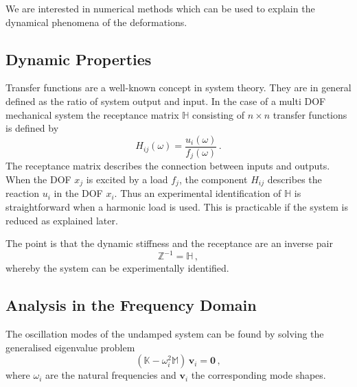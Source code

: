 \documentclass[conference]{journal}
\newcommand{\bb}[1]{\mathbb{#1}}
\newcommand{\B}[1]{\mathbf{#1}}
\newcommand{\M}{\bb{M}}
\newcommand{\K}{\bb{K}}
\begin{document}


	We are interested in numerical methods which can be used to explain the dynamical phenomena of the deformations. 

	\subsection{Dynamic Properties}
	Transfer functions are a well-known concept in system theory. They are in general defined as the ratio of system output and input. In the case of a multi DOF mechanical system the receptance matrix $\bb{H}$ consisting of $n \times n$ transfer functions is defined by
	\begin{equation}
	H_{ij}(\omega) = \frac{u_i(\omega)}{f_j(\omega)}\,.
	\end{equation}
	The receptance matrix describes the connection between inputs and outputs. When the DOF $x_j$ is excited by a load $f_j$, the component $H_{ij}$ describes the reaction $ u_i $ in the DOF $x_i$. Thus an experimental identification of $\bb{H}$ is straightforward when a harmonic load is used. This is practicable if the system is reduced as explained later.

	The point is that the dynamic stiffness and the receptance are an inverse pair
	\begin{equation}
	\bb{Z}^{-1} = \bb{H}\,,
	\end{equation}
	whereby the system can be experimentally identified.

	\subsection{Analysis in the Frequency Domain}
	The oscillation modes of the undamped system can be found by solving the generalised eigenvalue problem
	\begin{equation}
	\left( \K - \omega^2_i\M \right)\,\B{v}_i = \B{0}\,,
	\end{equation}
	where $\omega_i$ are the natural frequencies and $\B{v}_i$ the corresponding mode shapes.
\end{document}
